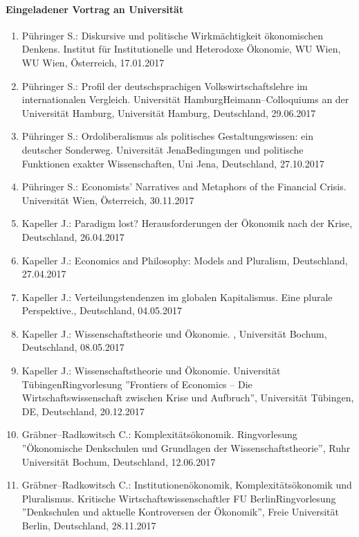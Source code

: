 \paragraph{Eingeladener Vortrag an Universität}
\begin{enumerate}
	\item Pühringer S.: Diskursive und politische Wirkmächtigkeit ökonomischen Denkens. Institut für Institutionelle und Heterodoxe Ökonomie, WU Wien, WU Wien, Österreich, 17.01.2017
	\item Pühringer S.: Profil der deutschsprachigen Volkswirtschaftslehre im internationalen Vergleich. Universität HamburgHeimann--Colloquiums an der Universität Hamburg, Universität Hamburg, Deutschland, 29.06.2017
	\item Pühringer S.: Ordoliberalismus als politisches Gestaltungswissen:  ein deutscher Sonderweg. Universität JenaBedingungen und politische Funktionen exakter Wissenschaften, Uni Jena, Deutschland, 27.10.2017
	\item Pühringer S.: Economists' Narratives and Metaphors of the Financial Crisis. Universität Wien, Österreich, 30.11.2017
	\item Kapeller J.: Paradigm lost? Herausforderungen der Ökonomik nach der Krise, Deutschland, 26.04.2017
	\item Kapeller J.: Economics and Philosophy: Models and Pluralism, Deutschland, 27.04.2017
	\item Kapeller J.: Verteilungstendenzen im globalen Kapitalismus. Eine plurale Perspektive., Deutschland, 04.05.2017
	\item Kapeller J.: Wissenschaftstheorie und Ökonomie. , Universität Bochum, Deutschland, 08.05.2017
	\item Kapeller J.: Wissenschaftstheorie und Ökonomie. Universität TübingenRingvorlesung ''Frontiers of Economics – Die Wirtschaftswissenschaft zwischen Krise und Aufbruch'', Universität Tübingen, DE, Deutschland, 20.12.2017
	\item Gräbner--Radkowitsch C.: Komplexitätsökonomik. Ringvorlesung ''Ökonomische Denkschulen und Grundlagen der Wissenschaftstheorie'', Ruhr Universität Bochum, Deutschland, 12.06.2017
	\item Gräbner--Radkowitsch C.: Institutionenökonomik, Komplexitätsökonomik und Pluralismus. Kritische Wirtschaftswissenschaftler FU BerlinRingvorlesung ''Denkschulen und aktuelle Kontroversen der Ökonomik'', Freie Universität Berlin, Deutschland, 28.11.2017
\end{enumerate}
